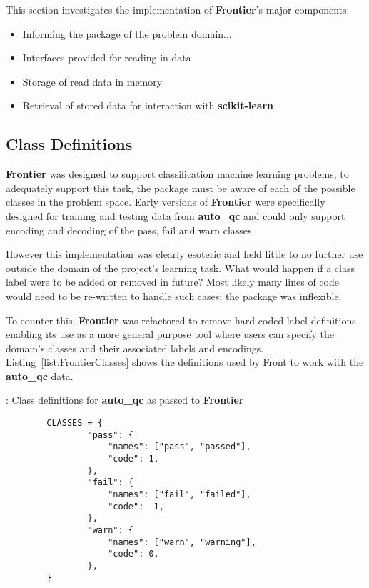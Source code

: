 This section investigates the implementation of \textbf{Frontier}'s major components:

\begin{itemize}
    \item Informing the package of the problem domain...
    \item Interfaces provided for reading in data
    \item Storage of read data in memory
    \item Retrieval of stored data for interaction with \textbf{scikit-learn}
\end{itemize}


\subsection{Class Definitions}
\label{chap:classes}

\textbf{Frontier} was designed to support classification machine learning problems, to
adequately support this task, the package must be aware of each of the possible
classes in the problem space. Early versions of \textbf{Frontier} were specifically
designed for training and testing data from \textbf{auto\_qc} and could only
support encoding and decoding of the pass, fail and warn classes.

However this implementation was clearly esoteric and held little to no further
use outside the domain of the project's learning task. What would happen if a
class label were to be added or removed in future? Most likely many lines of
code would need to be re-written to handle such cases; the package was
inflexible.

To counter this, \textbf{Frontier} was refactored to remove hard coded label definitions
enabling its use as a more general purpose tool where users can specify the
domain's classes and their associated labels and encodings.
Listing~\ref{list:FrontierClasses} shows the definitions used by Front to work
with the \textbf{auto\_qc} data.

\begin{listing}[H]
    \caption[FrontierClasses]{: Class definitions for \textbf{auto\_qc} as passed to \textbf{Frontier}}
    \label{list:FrontierClasses}
    \begin{verbatim}
        CLASSES = {
                "pass": {
                    "names": ["pass", "passed"],
                    "code": 1,
                },
                "fail": {
                    "names": ["fail", "failed"],
                    "code": -1,
                },
                "warn": {
                    "names": ["warn", "warning"],
                    "code": 0,
                },
        }
    \end{verbatim}
\end{listing}

